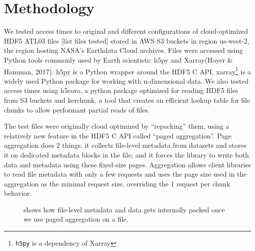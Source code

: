 \documentclass[
]{agujournal2019}
\begin{document}
\section{Methodology}\label{methodology}

We tested access times to original and different configurations of
cloud-optimized HDF5 ATL03 files {[}list files tested{]} stored in AWS
S3 buckets in region us-west-2, the region hosting NASA's Earthdata
Cloud archives. Files were accessed using Python tools commonly used by
Earth scientists: h5py and Xarray(Hoyer \& Hamman, 2017). h5py is a
Python wrapper around the HDF5 C API. xarray\footnote{\texttt{h5py} is a
  dependency of Xarray} is a widely used Python package for working with
n-dimensional data. We also tested access times using h5coro, a python
package optimized for reading HDF5 files from S3 buckets and kerchunk, a
tool that creates an efficient lookup table for file chunks to allow
performant partial reads of files.

The test files were originally cloud optimized by ``repacking'' them,
using a relatively new feature in the HDF5 C API called ``paged
aggregation''. Page aggregation does 2 things: it collects file-level
metadata from datasets and stores it on dedicated metadata blocks in the
file; and it forces the library to write both data and metadata using
these fixed-size pages. Aggregation allows client libraries to read file
metadata with only a few requests and uses the page size used in the
aggregation as the minimal request size, overriding the 1 request per
chunk behavior.

\begin{figure}


\caption{\label{fig-2}shows how file-level metadata and data gets
internally packed once we use paged aggregation on a file.}

\end{figure}%
\end{document}
